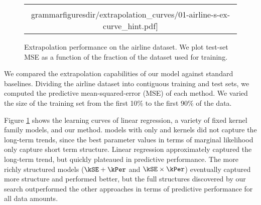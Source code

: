\begin{figure}
\centering
\begin{tabular}{c}
\hspace{-0.5cm}
\texttt{[image: \\grammarfiguresdir/extrapolation\_curves/01-airline-s-ex-curve\_hint.pdf]}
\end{tabular}
\caption[Comparison of extrapolation performance]
{Extrapolation performance on the airline dataset.  We plot test-set MSE as a function of the fraction of the dataset used for training. 
}
\label{fig:extrapolation}
\end{figure}

We compared the extrapolation capabilities of our model against standard baselines\footnotemark.
Dividing the airline dataset into contiguous training and test sets, we computed the predictive mean-squared-error (MSE) of each method.
We varied the size of the training set from the first 10\% to the first 90\% of the data.

Figure \ref{fig:extrapolation} shows the learning curves of linear regression, a variety of fixed kernel family \gp{} models, and our method.  
\gp{} models with only \kSE{} and \kPer{} kernels did not capture the long-term trends, since the best parameter values in terms of \gp{} marginal likelihood only capture short term structure. 
Linear regression approximately captured the long-term trend, but quickly plateaued in predictive performance.
The more richly structured \gp{} models (${\kSE + \kPer}$ and ${\kSE \times \kPer}$) eventually captured more structure and performed better, but the full structures discovered by our search outperformed the other approaches in terms of predictive performance for all data amounts.

\footnotetext{
In one dimension, the predictive means of all baseline methods in table \ref{tbl:Regression Mean Squared Error} are identical to that of a \gp{} with an $\kSE{}$ kernel.}



